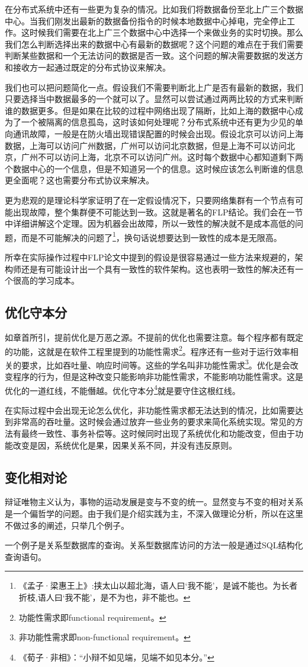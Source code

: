 在分布式系统中还有一些更为复杂的情况。比如我们将数据备份至北上广三个数据中心。当我们刚发出最新的数据备份指令的时候本地数据中心掉电，完全停止工作。这时候我们需要在北上广三个数据中心中选择一个来做业务的实时切换。那么我们怎么判断选择出来的数据中心有最新的数据呢？这个问题的难点在于我们需要判断某些数据和一个无法访问的数据是否一致。这个问题的解决需要数据的发送方和接收方一起通过既定的分布式协议来解决。

我们也可以把问题简化一点。假设我们不需要判断北上广是否有最新的数据，我们只要选择当中数据最多的一个就可以了。显然可以尝试通过两两比较的方式来判断谁的数据更多。但是如果在比较的过程中网络出现了隔断，比如上海的数据中心成为了一个被隔离的信息孤岛，这时该如何处理呢？分布式系统中还有更为少见的单向通讯故障，一般是在防火墙出现错误配置的时候会出现。假设北京可以访问上海数据，上海可以访问广州数据，广州可以访问北京数据，但是上海不可以访问北京，广州不可以访问上海，北京不可以访问广州。这时每个数据中心都知道剩下两个数据中心的一个信息，但是不知道另一个的信息。这时候应该怎么判断谁的信息更全面呢？这也需要分布式协议来解决。

更为悲观的是理论科学家证明了在一定假设情况下，只要网络集群有一个节点有可能出现故障，整个集群便不可能达到一致。这就是著名的FLP结论\cite{Fischer1985}。我们会在一节中详细讲解这个定理。因为机器会出故障，所以一致性的解决就不是成本高低的问题，而是不可能解决的问题了\footnote{《孟子·梁惠王上》:挟太山以超北海，语人曰‘我不能’，是诚不能也。为长者折枝,语人曰‘我不能’，是不为也，非不能也。}，换句话说想要达到一致性的成本是无限高。


所幸在实际操作过程中FLP论文中提到的假设是很容易通过一些方法来规避的，架构师还是有可能设计出一个具有一致性的软件架构。这也表明一致性的解决还有一个很高的学习成本。




\subsection{优化守本分}

如章首所引，提前优化是万恶之源。不提前的优化也需要注意。每个程序都有既定的功能，这就是在软件工程里提到的功能性需求\footnote{功能性需求即functional requirement。}。程序还有一些对于运行效率相关的要求，比如吞吐量、响应时间等。这些的学名叫非功能性需求\footnote{非功能性需求即non-functional requirement。}。优化是会改变程序的行为，但是这种改变只能影响非功能性需求，不能影响功能性需求。这是优化的一道红线，不能僭越。优化守本分\footnote{《荀子·非相》：“小辩不如见端，见端不如见本分。”}就是要守住这根红线。


在实际过程中会出现无论怎么优化，非功能性需求都无法达到的情况，比如需要达到非常高的吞吐量。这时候会通过放弃一些业务的要求来简化系统实现。常见的方法有最终一致性、事务补偿等。这时候同时出现了系统优化和功能改变，但由于功能改变是因，系统优化是果，因果关系不同，并没有违反原则。



\subsection{变化相对论}

辩证唯物主义认为，事物的运动发展是变与不变的统一。显然变与不变的相对关系是一个偏哲学的问题。由于我们是介绍实践为主，不深入做理论分析，所以在这里不做过多的阐述，只举几个例子。

一个例子是关系型数据库的查询。关系型数据库访问的方法一般是通过SQL结构化查询语句。










